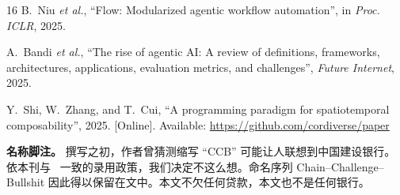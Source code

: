 \documentclass[journal]{IEEEtran}
\begin{document}
\begin{thebibliography}{16}
 B.~Niu \emph{et al.}, ``Flow: Modularized agentic workflow automation'', in \emph{Proc. ICLR}, 2025.

 A.~Bandi \emph{et al.}, ``The rise of agentic AI: A review of definitions, frameworks, architectures, applications, evaluation metrics, and challenges'', \textit{Future Internet}, 2025.

 Y.~Shi, W.~Zhang, and T.~Cui, ``A programming paradigm for spatiotemporal composability'', 2025. [Online]. Available: \url{https://github.com/cordiverse/paper}

\end{thebibliography}

\vspace{4pt}
\footnotesize
\textbf{名称脚注。} 撰写之初，作者曾猜测缩写 ``CCB'' 可能让人联想到中国建设银行。依本刊与~\cite{pumera2020,sokal1996} 一致的录用政策，我们决定不这么想。命名序列 Chain–Challenge–Bullshit 因此得以保留在文中。本文不欠任何贷款，本文也不是任何银行。
\end{document}
